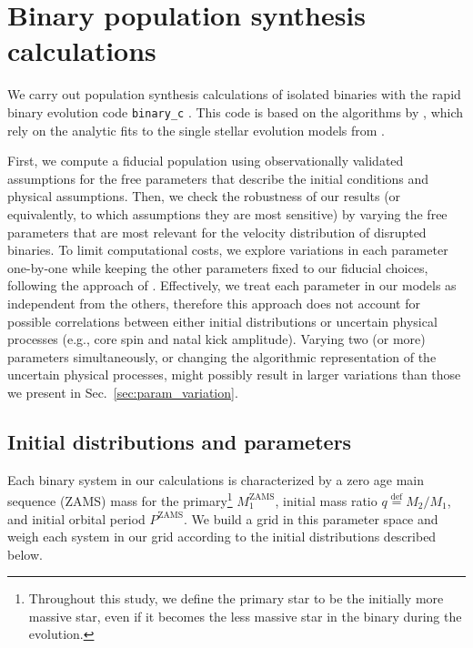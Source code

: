 \documentclass{aa}
\newcommand{\udef}{\stackrel{\mathrm{def}}{=}}
\DeclareRobustCommand{\Secref}[1]{Sec.~\ref{#1}}
\begin{document}
\section{Binary population synthesis calculations}
\label{sec:methods}

We carry out population synthesis calculations of isolated binaries with the rapid binary evolution code \texttt{binary\_c}
\citep[][]{izzard:04,izzard:06,izzard:09,demink:13,schneider:15,izzard:18}. This
code is based on the algorithms by \cite{tout:97,hurley:00,hurley:02}, which rely on the analytic fits to the
single stellar evolution models from \cite{pols:98}.

First, we compute a fiducial population using observationally
validated assumptions for the free parameters that describe the initial
conditions and physical assumptions.
Then, we check the robustness of our results (or
equivalently, to which assumptions they are most sensitive) by varying
the free parameters that are most relevant for the
velocity distribution of disrupted binaries. To limit
computational costs, we explore variations in each parameter
one-by-one while keeping the other parameters fixed to our
fiducial choices, following the approach of
\cite{Fragos+2013a,demink:13,demink:14,zapartas:17,zapartas:17b,
  belczynski:17}. Effectively, we treat
each parameter in our models as independent from the others, therefore this approach does not account for possible
correlations between either initial distributions \citep[e.g., the one between initial period and mass ratio
suggested by][]{moe:17} or uncertain
physical processes (e.g., core spin and natal kick amplitude). Varying
two (or more) parameters simultaneously, or changing the algorithmic
representation of the uncertain physical processes, might possibly result in
larger variations than those we present in
\Secref{sec:param_variation}.

\subsection{Initial distributions and parameters}

Each binary system in our calculations is characterized by a zero age
main sequence (ZAMS)
mass for the primary\footnote{Throughout this study, we define the primary star
  to be the initially more massive star, even
  if it becomes the less massive star in the binary during the evolution.}
$M_1^\mathrm{ZAMS}$, initial mass ratio $q\udef M_2/M_1$, and initial orbital
period $P^\mathrm{ZAMS}$. We build a grid in this parameter space and
weigh each system in our grid according to the initial distributions
described below.
\end{document}
